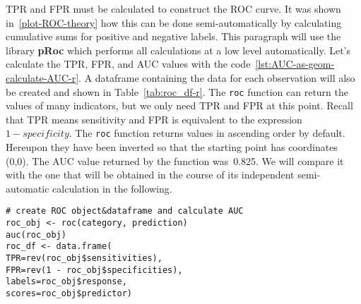 \documentclass[]{scrreprt}
\begin{document}
TPR and FPR must be calculated to construct the ROC curve. It was shown in~\ref{plot-ROC-theory} how this can be done semi-automatically by calculating cumulative sums for positive and negative labels. This paragraph will use the library \textbf{pRoc} which performs all calculations at a low level automatically. Let's calculate the TPR, FPR, and AUC values with the code~\ref{lst:AUC-as-geom-calculate-AUC-r}. A dataframe containing the data for each observation will also be created and shown in Table~\ref{tab:roc_df-r}. The \texttt{roc} function can return the values of many indicators, but we only need TPR and FPR at this point. Recall that TPR means sensitivity and FPR is equivalent to the expression $1 - specificity$. The \texttt{roc} function returns values in ascending order by default. Hereupon they have been inverted so that the starting point has coordinates (0,0). The AUC value returned by the function was~0.825. We will compare it with the one that will be obtained in the course of its independent semi-automatic calculation in the following.
%
\begin{lstlisting}[float=htp, caption = Calculation of~the AUC using the pRoc library, firstnumber=1, label= lst:AUC-as-geom-calculate-AUC-r]
# create ROC object&dataframe and calculate AUC
roc_obj <- roc(category, prediction)
auc(roc_obj)
roc_df <- data.frame(
TPR=rev(roc_obj$sensitivities), 
FPR=rev(1 - roc_obj$specificities), 
labels=roc_obj$response, 
scores=roc_obj$predictor)
\end{lstlisting}
%
\end{document}
